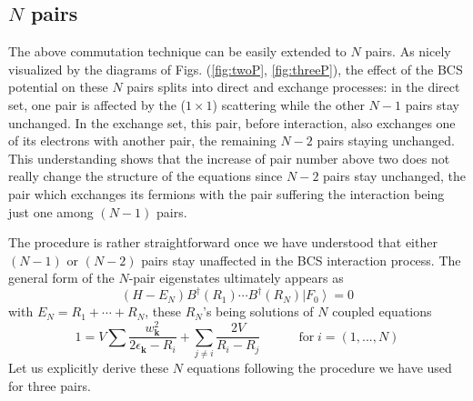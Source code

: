 \documentclass[epj]{svjour}
\begin{document}
\subsection{$N$ pairs}

The above commutation technique can be easily extended to $N$ pairs. As nicely
visualized by the diagrams of Figs. (\ref{fig:twoP}, \ref{fig:threeP}), the
effect of the BCS potential on these $N$ pairs splits into direct and exchange processes:
in the direct set, one pair is affected by the ($1\times1$) scattering while the other $N-1
$ pairs stay unchanged. In the exchange set, this pair, before interaction, also 
exchanges one of its electrons with another pair, the remaining $N-2$
pairs staying unchanged. This understanding shows that the increase of pair number above two does not really change the structure of the equations
since $N-2$ pairs stay unchanged, the pair which exchanges its fermions with the
pair suffering the interaction being just one among $(N-1)$ pairs.

The procedure is rather straightforward once we have understood
that either $(N-1)$ or $(N-2)$ pairs stay unaffected in the BCS interaction process. The
general form of the $N$-pair eigenstates ultimately appears as 
\begin{equation}  \label{eq:SchThreeN}
(H-E _N)B^{\dagger}(R_1)\cdots{}B^{\dagger}(R_N)\left|F_0\right>  =0
\end{equation}
with $E _N=R_1+\cdots+R_N$, these $R_N$'s being solutions of $N$ coupled
equations 
\begin{equation}
1=V\sum\frac{w_{\mathbf{k} }^2}{2\epsilon_{\mathbf{k} }-R_i}+\sum_{j\neq{i}}%
\frac{2V}{R_i-R_j}\quad\qquad \text{for}\; i=\left(1,...,N\right) 
\end{equation}
Let us explicitly derive these $N$ equations following the procedure we have used for three pairs. 
\end{document}

